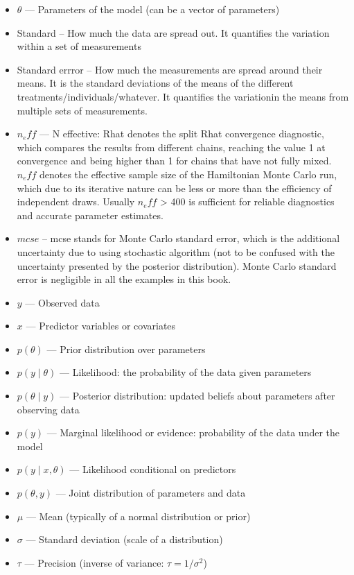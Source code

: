 \documentclass[a4paper,12pt]{article}
\begin{document}
\begin{itemize}
  \item $\theta$ --- Parameters of the model (can be a vector of parameters)
  \item Standard  -- How much the data are spread out. It quantifies the variation within a set of measurements
  \item Standard errror -- How much the measurements are spread around their means. It is the standard deviations of the means of the different treatments/individuals/whatever. It quantifies the variationin the means from multiple sets of measurements.
  \item $n_eff$ ---  N effective: Rhat denotes the split Rhat convergence diagnostic, which compares the results from different chains, reaching the value 1 at convergence and being higher than 1 for chains that have not fully mixed. $n_eff$ denotes the effective sample size of the Hamiltonian Monte Carlo run, which due to its iterative nature can be less or more than the efficiency of independent draws. Usually $n_eff$ > 400 is sufficient for reliable diagnostics and accurate parameter estimates.
  \item $mcse$ -- mcse stands for Monte Carlo standard error, which is the additional uncertainty due to using stochastic algorithm (not to be confused with the uncertainty presented by the posterior distribution). Monte Carlo standard error is negligible in all the examples in this book.
  \item $y$ --- Observed data
  \item $x$ --- Predictor variables or covariates
  \item $p(\theta)$ --- Prior distribution over parameters
  \item $p(y \mid \theta)$ --- Likelihood: the probability of the data given parameters
  \item $p(\theta \mid y)$ --- Posterior distribution: updated beliefs about parameters after observing data
  \item $p(y)$ --- Marginal likelihood or evidence: probability of the data under the model
  \item $p(y \mid x, \theta)$ --- Likelihood conditional on predictors
  \item $p(\theta, y)$ --- Joint distribution of parameters and data
  \item $\mu$ --- Mean (typically of a normal distribution or prior)
  \item $\sigma$ --- Standard deviation (scale of a distribution)
  \item $\tau$ --- Precision (inverse of variance: $\tau = 1/\sigma^2$)

\end{itemize}
\end{document}
